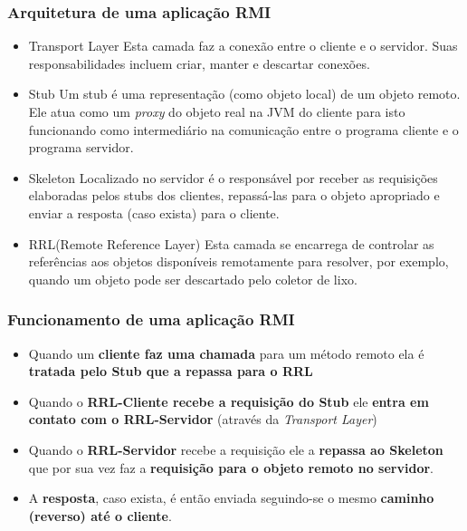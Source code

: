 \documentclass[Ligatures=TeX,table,brazil,svgnames,usetotalslideindicator,comp
ress,10pt]{beamer}
\begin{document}
\begin{frame}
  \frametitle{Arquitetura de uma aplicação RMI}
  \begin{itemize}
  \item \alert{Transport Layer} Esta camada faz a conexão entre o
    cliente e o servidor. Suas responsabilidades incluem criar, manter
    e descartar conexões.

  \item \alert{Stub} Um stub é uma representação (como objeto local)
    de um objeto remoto. Ele atua como um \emph{proxy} do objeto real
    na JVM do cliente para isto funcionando como intermediário na
    comunicação entre o programa cliente e o programa servidor.

  \item \alert{Skeleton} Localizado no servidor é o responsável por
    receber as requisições elaboradas pelos stubs dos clientes,
    repassá-las para o objeto apropriado e enviar a resposta (caso
    exista) para o cliente.

  \item \alert{RRL(Remote Reference Layer)} Esta camada se encarrega de controlar as referências aos objetos disponíveis remotamente para resolver, por exemplo, quando um objeto pode ser descartado pelo coletor de lixo.
  \end{itemize}
\end{frame}

\begin{frame}
  \frametitle{Funcionamento de uma aplicação RMI}
  \begin{itemize}
  \item Quando um \textbf{cliente faz uma chamada} para um método remoto ela é
    \textbf{tratada pelo Stub que a repassa para o RRL}
  \item Quando o \textbf{RRL-Cliente recebe a requisição do Stub} ele
    \textbf{entra em contato com o RRL-Servidor} (através da
    \emph{Transport Layer})
  \item Quando o \textbf{RRL-Servidor} recebe a requisição ele a \textbf{repassa ao
    Skeleton} que por sua vez faz a \textbf{requisição para o objeto remoto no
    servidor}.
  \item A \textbf{resposta}, caso exista, é então enviada seguindo-se o mesmo
    \textbf{caminho (reverso) até o cliente}.
  \end{itemize}
\end{frame}
\end{document}
